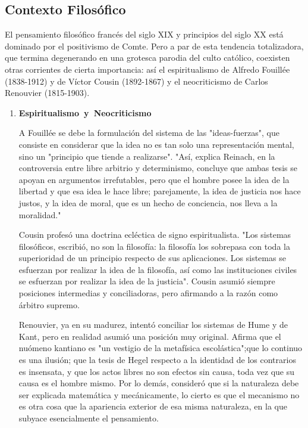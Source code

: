 \subsection{Contexto Filos\'ofico}

El pensamiento filosófico francés del siglo XIX y principios del siglo XX está dominado por el positivismo de Comte.
Pero a par de esta tendencia totalizadora, que termina degenerando en una grotesca parodia del culto católico, coexisten otras corrientes de cierta importancia:
así el espiritualismo de Alfredo Fouillée (1838-1912) y de Víctor Cousin (1892-1867) y el neocriticismo de Carlos Renouvier (1815-1903).
\begin{enumerate}
\item \textbf{Espiritualismo\ y\ Neocriticismo}

A Fouillée se debe la formulación del sistema de las "ideas-fuerzas", que consiste en considerar que la idea no es tan solo
una representación mental, sino un "principio que tiende a realizarse".
"Así, explica Reinach, en la controversia entre libre arbitrio y determinismo, concluye que ambas tesis se apoyan en argumentos
irrefutables, pero que el hombre posee la idea de la libertad y que esa idea le hace libre;
parejamente, la idea de justicia nos hace justos, y la idea de moral, que es un hecho de conciencia, nos lleva a la moralidad."

Cousin profesó una doctrina ecléctica de signo espiritualista.
"Los sistemas filosóficos, escribió, no son la filosofía: la filosofía los sobrepasa con toda la superioridad de un principio respecto de sus aplicaciones.
Los sistemas se esfuerzan por realizar la idea de la filosofía, así como las instituciones civiles se esfuerzan por realizar la idea de la justicia".
Cousin asumió siempre posiciones intermedias y conciliadoras, pero afirmando a la razón como árbitro supremo.

Renouvier, ya en su madurez, intentó conciliar los sistemas de Hume y de Kant, pero en realidad asumió una posición muy original.
Afirma que el nuómeno kantiano es "un vestigio de la metafísica escolástica";que lo continuo es una ilusión;
que la tesis de Hegel respecto a la identidad de los contrarios es insensata, y que los actos libres no son efectos sin causa, toda vez que su causa es el hombre mismo.
Por lo demás, consideró que si la naturaleza debe ser explicada matemática y mecánicamente, lo cierto es que el mecanismo no es otra cosa que la apariencia exterior
de esa misma naturaleza, en la que subyace esencialmente el pensamiento.


\end{enumerate}

